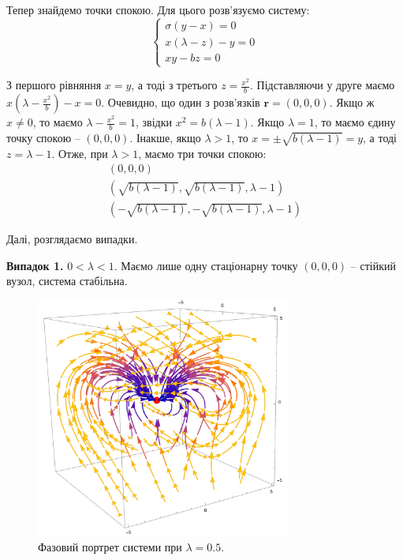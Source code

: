 \documentclass[oneside,solution]{tmpl}
\begin{document}
Тепер знайдемо точки спокою. Для цього розв'язуємо систему:
\begin{equation}
    \begin{cases}
        \sigma(y-x) = 0 \\
        x(\lambda - z) - y = 0 \\
        xy - bz = 0
    \end{cases}
\end{equation}

З першого рівняння $x=y$, а тоді з третього $z = \frac{x^2}{b}$. Підставляючи у друге маємо $x\left(\lambda - \frac{x^2}{b}\right) - x = 0$. Очевидно, що один з розв'язків $\boldsymbol{r}=(0,0,0)$. Якщо ж $x \neq 0$, то маємо $\lambda - \frac{x^2}{b} = 1$, звідки $x^2 = b(\lambda - 1)$. Якщо $\lambda=1$, то маємо єдину точку спокою -- $(0,0,0)$. Інакше, якщо $\lambda>1$, то $x = \pm\sqrt{b(\lambda-1)}=y$, а тоді $z=\lambda-1$. Отже, при $\lambda > 1$, маємо три точки спокою:
\begin{gather}
    (0,0,0) \nonumber \\
    (\sqrt{b(\lambda-1)},\sqrt{b(\lambda-1)},\lambda-1) \nonumber \\
    (-\sqrt{b(\lambda-1)},-\sqrt{b(\lambda-1)},\lambda-1)
\end{gather}

Далі, розглядаємо випадки.

\textbf{Випадок 1.} $0 < \lambda < 1$. Маємо лише одну стаціонарну точку $(0,0,0)$ -- стійкий вузол, система стабільна.

\begin{figure}[H]
    \centering
    \includegraphics[width=0.75\textwidth]{images/hw_8/lorentz_case_1.pdf}
    \caption{Фазовий портрет системи при $\lambda = 0.5$.}
\end{figure}
\end{document}
